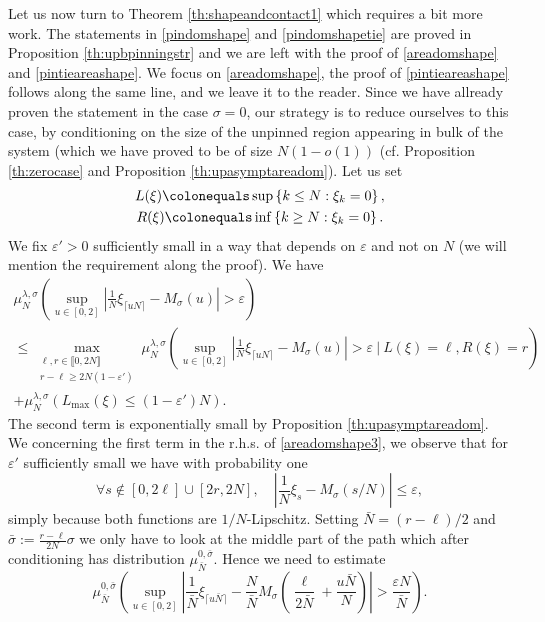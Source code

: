 \documentclass[reqno,11pt]{amsart}
\numberwithin{equation}{section}
\newcommand{\gep}{\varepsilon}       %
\newcommand{\gl}{\lambda}
\newcommand{\gs}{\sigma}
\newcommand{\lint}{\llbracket}
\newcommand{\rint}{\rrbracket}
\newcommand{\maxtwo}[2]{\max_{\substack{#1 \\ #2}}} %
\begin{document}
 Let us now turn to Theorem \ref{th:shapeandcontact1} which requires a bit more work.
 The statements in \eqref{pindomshape} and \eqref{pindomshapetie} are proved in Proposition \ref{th:upbpinningstr} and we are left with the proof of \eqref{areadomshape} and \eqref{pintieareashape}. We focus on \eqref{areadomshape}, the proof of \eqref{pintieareashape} follows along the same line, and we leave it to the reader.
 Since we have allready proven the statement in the case $\sigma=0$, our strategy is to reduce ourselves to this case, by conditioning on the size of the unpinned region appearing in bulk of the system (which we have proved to be of size $N(1-o(1))$ (cf. Proposition \ref{th:zerocase} and Proposition \ref{th:upasymptareadom}). Let us set
 \begin{equation}\label{leftrightcontacts}
\begin{gathered}
L(\xi) \colonequals \sup \left\{k\leq N: \xi_k=0  \right\},\\
R(\xi) \colonequals \inf \left\{k\geq N: \xi_k=0 \right\}.
\end{gathered}
\end{equation}
We fix $\gep'>0$ sufficiently small in a way that depends on $\gep$ and not on $N$ (we will mention the requirement along the proof).
 We have 
 \begin{multline}\label{areadomshape3}
\mu_N^{\gl,\gs} \left(\sup_{u \in [0, 2]} \left\vert \frac{1}{N}\xi_{\lceil uN \rceil}-M_{\gs}(u)\right\vert > \gep \right) \\ \le   \maxtwo{\ell,r\in \lint 0, 2N\rint }{ r-\ell \ge 2N(1-\gep')}\mu_N^{\gl,\gs} \left( \sup_{u \in [0, 2]} \left\vert \frac{1}{N}\xi_{\lceil uN \rceil}-M_{\gs}(u)\right\vert >   \gep  \ \Big| \ L(\xi)=  \ell, 
R(\xi)= r \right)\\
 +  \mu_N^{\gl,\gs} \left(  L_{\max}(\xi) \le (1-\gep')N  \right). 
\end{multline}
The second term is exponentially small by Proposition \ref{th:upasymptareadom}.
We concerning the first term in the r.h.s. of \eqref{areadomshape3},  we observe that for $\gep'$ sufficiently small we have with probability one
$$\forall s\notin [0,2\ell] \cup[2r,2N],\quad  \left\vert \frac{1}{N}\xi_{ s }-M_{\gs}(s/N)\right\vert \le   \gep,$$ 
simply because both functions are $1/N$-Lipschitz. Setting $\bar N=(r-\ell)/2$ and $\bar \sigma:=\frac{ r-\ell}{2N} \sigma $ we only have to look at the middle part of the path which after conditioning has distribution $\mu_{\bar N}^{0,\bar \gs}$. Hence we need to estimate 
\begin{equation}
 \mu_{\bar N}^{0,\bar \gs} \left( \sup_{u \in [0, 2]} \left\vert \frac{1}{\bar N}\xi_{\lceil u \bar N \rceil}- \frac{N}{\bar N}M_{\gs}\left( \frac{\ell}{2\bar N}+\frac{u \bar N}{N}  \right)\right\vert >\frac{\gep  N}{\bar N} \right).
\end{equation}
\end{document}

